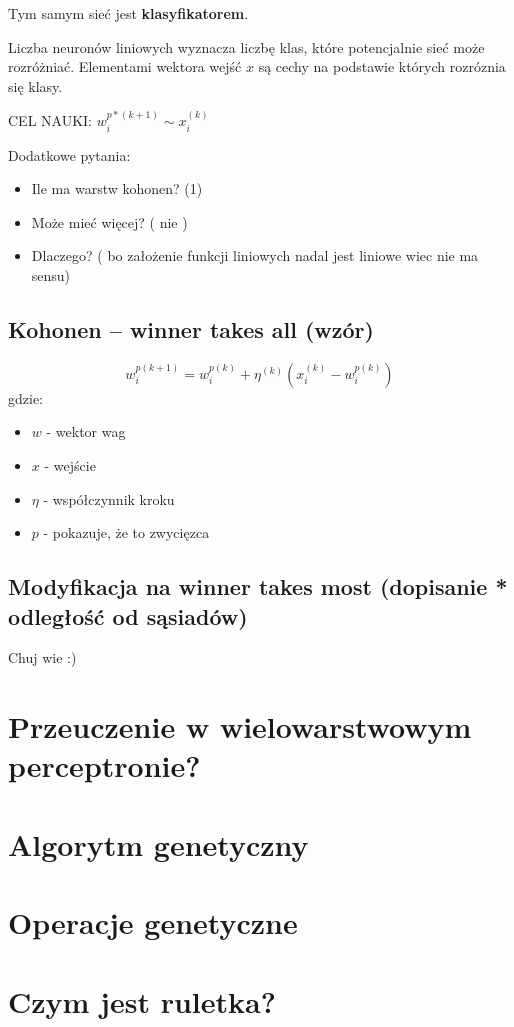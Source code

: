 \documentclass[a4paper,12pt]{article}
\begin{document}
Tym samym sieć jest \textbf{klasyfikatorem}.

Liczba neuronów liniowych wyznacza liczbę klas, które potencjalnie sieć może rozróżniać.
Elementami wektora wejść $x$ są cechy na podstawie których rozróznia się klasy.

CEL NAUKI: $w_i ^{p*(k + 1)} \sim x_i^{(k)}$

Dodatkowe pytania:
\begin{itemize}
    \item {Ile ma warstw kohonen? (1)}
    \item {Może mieć więcej? ( nie )}
    \item {Dlaczego? ( bo założenie funkcji liniowych nadal jest liniowe wiec nie ma sensu)}
\end{itemize}

\subsection{Kohonen – winner takes all (wzór)}
\[
    w_i^{p(k+1)} = w_i^{p(k)} + \eta^{(k)} (x_i^{(k)} - w_i^{p(k)})
\]
gdzie:
\begin{itemize}
    \item $w$ - wektor wag
    \item $x$ - wejście
    \item $\eta$ - współczynnik kroku
    \item $p$ - pokazuje, że to zwycięzca
\end{itemize}

\subsection{Modyfikacja na winner takes most (dopisanie * odległość od sąsiadów)}
Chuj wie :)


\section{Przeuczenie w wielowarstwowym perceptronie?}

\section{Algorytm genetyczny}

\section{Operacje genetyczne}

\section{Czym jest ruletka?}
\end{document}
